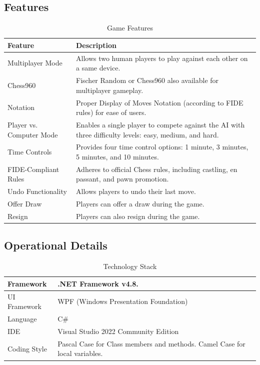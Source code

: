 \documentclass[a4paper,12pt]{article}
\begin{document}
\subsection{Features}
\begin{longtable}{|p{}|p{}|}
    \caption{Game Features}
    \hline
    \textbf{Feature} & \textbf{Description} \\
    \hline
    Multiplayer Mode & Allows two human players to play against each other on a same device. \\
    \hline
    Chess960 & Fischer Random or Chess960 also available for multiplayer gameplay. \\
    \hline
    Notation & Proper Display of Moves Notation (according to FIDE rules) for ease of users. \\
    \hline
    Player vs. Computer Mode & Enables a single player to compete against the AI with three difficulty levels: easy, medium, and hard. \\
    \hline
    Time Controls & Provides four time control options: 1 minute, 3 minutes, 5 minutes, and 10 minutes. \\
    \hline
    FIDE-Compliant Rules & Adheres to official Chess rules, including castling, en passant, and pawn promotion. \\
    \hline
    Undo Functionality & Allows players to undo their last move. \\
    \hline
    Offer Draw & Players can offer a draw during the game. \\
    \hline
    Resign & Players can also resign during the game. \\
    \hline
\end{longtable}

\subsection{Operational Details}
\begin{longtable}{|p{}|p{}|}
    \caption{Technology Stack}
    \hline
    Framework & .NET Framework v4.8. \\
    \hline
    UI Framework & WPF (Windows Presentation Foundation)   \\
    \hline
    Language & C\# \\
    \hline
    IDE & Visual Studio 2022 Community Edition \\
    \hline
    Coding Style & Pascal Case for Class members and methods. Camel Case for local variables. \\
    \hline
\end{longtable}
\end{document}
